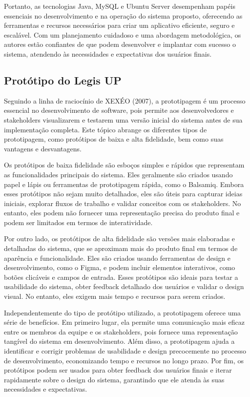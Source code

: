 \documentclass[12pt]{article}
\begin{document}
Portanto, as tecnologias Java, MySQL e Ubuntu Server desempenham papéis essenciais no desenvolvimento e na operação do sistema proposto, oferecendo as ferramentas e recursos necessários para criar um aplicativo eficiente, seguro e escalável. Com um planejamento cuidadoso e uma abordagem metodológica, os autores estão confiantes de que podem desenvolver e implantar com sucesso o sistema, atendendo às necessidades e expectativas dos usuários finais.


\subsection{Protótipo do Legis UP}

Seguindo a linha de raciocínio de XEXÉO (2007), a prototipagem é um processo essencial no desenvolvimento de software, pois permite aos desenvolvedores e stakeholders visualizarem e testarem uma versão inicial do sistema antes de sua implementação completa. Este tópico abrange os diferentes tipos de prototipagem, como protótipos de baixa e alta fidelidade, bem como suas vantagens e desvantagens.

Os protótipos de baixa fidelidade são esboços simples e rápidos que representam as funcionalidades principais do sistema. Eles geralmente são criados usando papel e lápis ou ferramentas de prototipagem rápida, como o Balsamiq. Embora esses protótipos não sejam muito detalhados, eles são úteis para capturar ideias iniciais, explorar fluxos de trabalho e validar conceitos com os stakeholders. No entanto, eles podem não fornecer uma representação precisa do produto final e podem ser limitados em termos de interatividade.

Por outro lado, os protótipos de alta fidelidade são versões mais elaboradas e detalhadas do sistema, que se aproximam mais do produto final em termos de aparência e funcionalidade. Eles são criados usando ferramentas de design e desenvolvimento, como o Figma, e podem incluir elementos interativos, como botões clicáveis e campos de entrada. Esses protótipos são ideais para testar a usabilidade do sistema, obter feedback detalhado dos usuários e validar o design visual. No entanto, eles exigem mais tempo e recursos para serem criados.

Independentemente do tipo de protótipo utilizado, a prototipagem oferece uma série de benefícios. Em primeiro lugar, ela permite uma comunicação mais eficaz entre os membros da equipe e os stakeholders, pois fornece uma representação tangível do sistema em desenvolvimento. Além disso, a prototipagem ajuda a identificar e corrigir problemas de usabilidade e design precocemente no processo de desenvolvimento, economizando tempo e recursos no longo prazo. Por fim, os protótipos podem ser usados para obter feedback dos usuários finais e iterar rapidamente sobre o design do sistema, garantindo que ele atenda às suas necessidades e expectativas.
\end{document}
